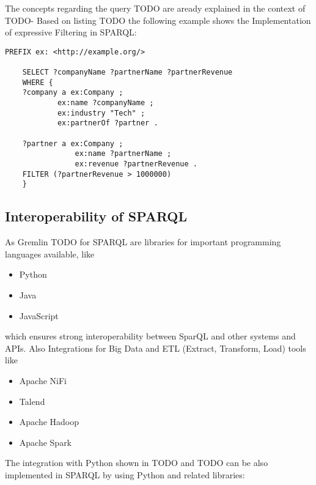 The concepts regarding the query TODO are aready explained in the context of TODO-
Based on listing TODO the following example shows the Implementation of expressive Filtering in
SPARQL:
\begin{lstlisting}[caption={Expressive Filtering in SPARQL}, label={lst:aggFuncSPARQL}]
	PREFIX ex: <http://example.org/>

	SELECT ?companyName ?partnerName ?partnerRevenue
	WHERE {
	?company a ex:Company ;
			ex:name ?companyName ;
			ex:industry "Tech" ;
			ex:partnerOf ?partner .
	
	?partner a ex:Company ;
				ex:name ?partnerName ;
				ex:revenue ?partnerRevenue .
	FILTER (?partnerRevenue > 1000000)
	}
\end{lstlisting}

\subsection{Interoperability of SPARQL}
As Gremlin TODO for SPARQL are libraries for important programming languages available, like 
\begin{itemize}
	\item Python
	\item Java
	\item JavaScript
\end{itemize}
which ensures strong interoperability between SparQL and other systems and APIs. 
Also Integrations for Big Data and ETL (Extract, Transform, Load) tools like 
\begin{itemize}
	\item Apache NiFi
	\item Talend 
	\item Apache Hadoop
	\item Apache Spark
\end{itemize}
The integration with Python shown in TODO and TODO can be also implemented in SPARQL by using 
Python and related libraries:
